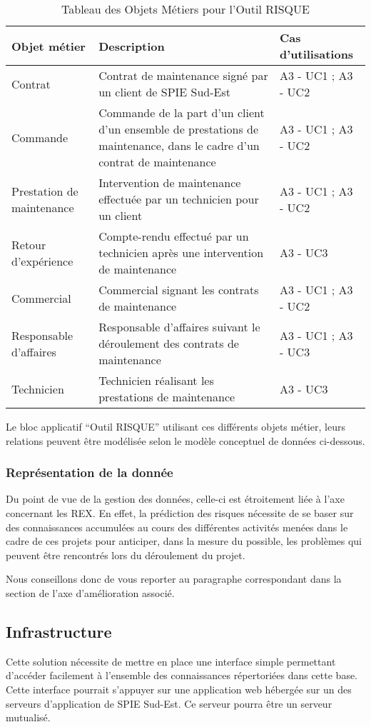 \begin{table}[H]
    \begin{tabular}{p{3cm}|p{10cm}|p{3cm}}
    Objet métier & Description & Cas d'utilisations \\ \hline
    Contrat & Contrat de maintenance signé par un client de SPIE Sud-Est & A3 - UC1 ; A3 - UC2 \\ \hline
    Commande & Commande de la part d’un client d’un ensemble de prestations de maintenance, dans le cadre d’un contrat de maintenance & A3 - UC1 ; A3 - UC2 \\ \hline
    Prestation de maintenance & Intervention de maintenance effectuée par un technicien pour un client & A3 - UC1 ; A3 - UC2 \\ \hline
    Retour d’expérience & Compte-rendu effectué par un technicien après une intervention de maintenance & A3 - UC3 \\ \hline
    Commercial & Commercial signant les contrats de maintenance & A3 - UC1 ; A3 - UC2 \\ \hline
    Responsable d’affaires & Responsable d’affaires suivant le déroulement des contrats de maintenance & A3 - UC1 ; A3 - UC3 \\ \hline
    Technicien & Technicien réalisant les prestations de maintenance & A3 - UC3 \\
    \end{tabular}
    \caption{Tableau des Objets Métiers pour l'Outil RISQUE}
\end{table}

Le bloc applicatif “Outil RISQUE” utilisant ces différents objets métier, leurs relations peuvent être modélisée selon le modèle conceptuel de données ci-dessous.


\subsubsection{Représentation de la donnée}

Du point de vue de la gestion des données, celle-ci est étroitement liée à l’axe concernant les REX. En effet, la prédiction des risques nécessite de se baser sur des connaissances accumulées au cours des différentes activités menées dans le cadre de ces projets pour anticiper, dans la mesure du possible, les problèmes qui peuvent être rencontrés lors du déroulement du projet.

Nous conseillons donc de vous reporter au paragraphe correspondant dans la section de l’axe d’amélioration associé.

\subsection{Infrastructure}

Cette solution nécessite de mettre en place une interface simple permettant d’accéder facilement à l’ensemble des connaissances répertoriées dans cette base. Cette interface pourrait s’appuyer sur une application web hébergée sur un des serveurs d’application de SPIE Sud-Est. Ce serveur pourra être un serveur mutualisé.
